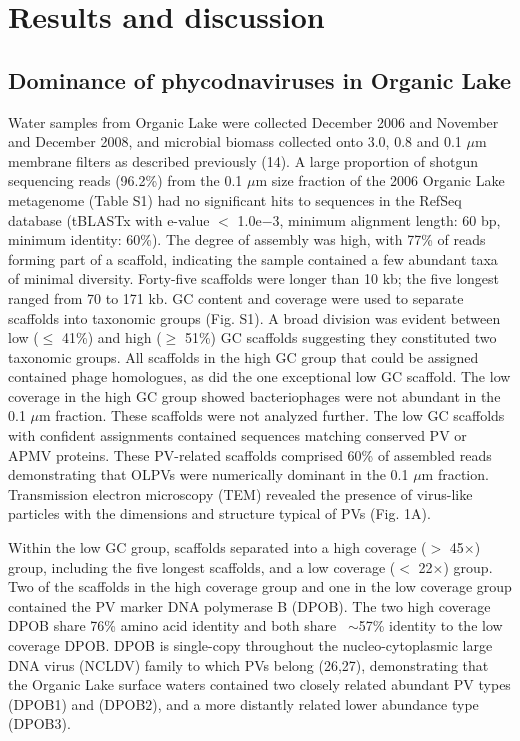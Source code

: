 \section{Results and discussion}
\subsection{Dominance of phycodnaviruses in Organic Lake}
Water samples from Organic Lake were collected December 2006 and November and December 2008, and microbial biomass collected onto 3.0, 0.8 and 0.1 $\mu$m membrane filters as described previously (14). 
A large proportion of shotgun sequencing reads (96.2\%) from the 0.1 $\mu$m size fraction of the 2006 Organic Lake metagenome (Table S1) had no significant hits to sequences in the RefSeq database 
(tBLASTx with e-value $<$ 1.0e$-$3, minimum alignment length: 60 bp, minimum identity: 60\%). 
The degree of assembly was high, with 77\% of reads forming part of a scaffold, indicating the sample contained a few abundant taxa of minimal diversity. 
Forty-five scaffolds were longer than 10 kb; the five longest ranged from 70 to 171 kb. 
GC content and coverage were used to separate scaffolds into taxonomic groups (Fig. S1). 
A broad division was evident between low ($\le$ 41\%) and high ($\ge$ 51\%) GC scaffolds suggesting they constituted two taxonomic groups. 
All scaffolds in the high GC group that could be assigned contained phage homologues, as did the one exceptional low GC scaffold. 
The low coverage in the high GC group showed bacteriophages were not abundant in the 0.1 $\mu$m fraction. 
These scaffolds were not analyzed further. 
The low GC scaffolds with confident assignments contained sequences matching conserved PV or APMV proteins. 
These PV-related scaffolds comprised 60\% of assembled reads demonstrating that OLPVs were numerically dominant in the 0.1 $\mu$m fraction. 
Transmission electron microscopy (TEM) revealed the presence of virus-like particles with the dimensions and structure typical of PVs (Fig. 1A).

Within the low GC group, scaffolds separated into a high coverage ($>$ 45$\times$) group, including the five longest scaffolds, and a low coverage ($<$ 22$\times$) group. 
Two of the scaffolds in the high coverage group and one in the low coverage group contained the PV marker DNA polymerase B (DPOB). 
The two high coverage DPOB share 76\% amino acid identity and both share ~$\sim$57\% identity to the low coverage DPOB. 
DPOB is single-copy throughout the nucleo-cytoplasmic large DNA virus (NCLDV) family to which PVs belong (26,27), 
demonstrating that the Organic Lake surface waters contained two closely related abundant PV types (DPOB1) and (DPOB2), and a more distantly related lower abundance type (DPOB3). 

